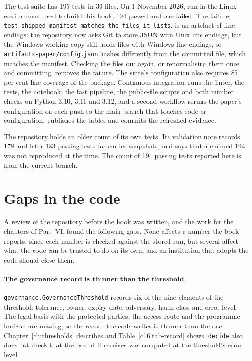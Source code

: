 The test suite has 195 tests in 30 files. On 1 November 2026, run in the Linux
environment used to build this book, 194 passed and one failed.
The failure, \texttt{test\_\allowbreak{}shipped\_\allowbreak{}manifest\_\allowbreak{}matches\_\allowbreak{}the\_\allowbreak{}files\_\allowbreak{}it\_\allowbreak{}lists}, is an
artefact of line endings: the repository now asks Git to store JSON with Unix line
endings, but the Windows working copy still holds files with Windows line endings, so
\texttt{artifacts-paper/\allowbreak{}config.\allowbreak{}json} hashes differently from the committed file, which
matches the manifest. Checking the files out again, or renormalising them once and
committing, removes the failure. The suite's configuration also requires 85 per cent
line coverage of the package. %
Continuous integration runs the linter, the tests, the notebook, the fast pipeline,
the public-file scripts and both number checks on Python 3.10, 3.11 and 3.12, and a
second workflow reruns the paper's configuration on each push to the main branch that
touches code or configuration, publishes the tables and commits the refreshed
evidence. %

The repository holds an older count of its own tests. Its validation note records 178
and later 183 passing tests for earlier snapshots, and says that a claimed 194 was not
reproduced at the time. %
The count of 194 passing tests reported here is from the current branch.

\section{Gaps in the code}

A review of the repository before the book was written, and the work for the chapters
of Part~VI, found the following gaps. None affects a number the book reports, since
each number is checked against the stored run, but several affect what the code can
be trusted to do on its own, and an institution that adopts the code should close
them.

\paragraph{The governance record is thinner than the threshold.}
\texttt{governance.GovernanceThreshold} records six of the nine elements of the
threshold: tolerance, owner, expiry date, adversary, harm class and error level. The
legal basis with the protected parties, the access route and the programme horizon are
missing, so the record the code writes is thinner than the one
Chapter~\ref{ch:thresholds} describes and Table~\ref{c16:tab-record} shows. \texttt{decide}
also does not check that the bound it receives was computed at the threshold's error
level.

